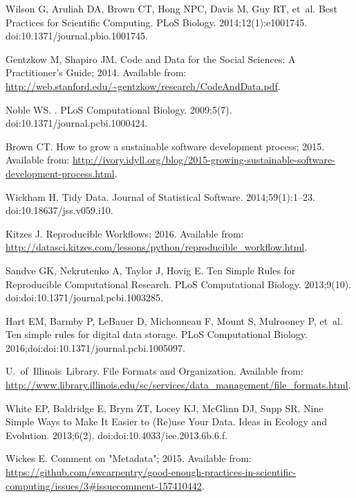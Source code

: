 \documentclass[10pt,letterpaper]{article}
\begin{document}
\begin{thebibliography}{10}

Wilson G, Aruliah DA, Brown CT, Hong NPC, Davis M, Guy RT, et~al.
\newblock Best Practices for Scientific Computing.
\newblock PLoS Biology. 2014;12(1):e1001745.
\newblock doi:{10.1371/journal.pbio.1001745}.

Gentzkow M, Shapiro JM. Code and Data for the Social Sciences: A Practitioner's
  Guide; 2014.
\newblock Available from:
  \url{http://web.stanford.edu/~gentzkow/research/CodeAndData.pdf}.

Noble WS.
.
\newblock PLoS Computational Biology. 2009;5(7).
\newblock doi:{10.1371/journal.pcbi.1000424}.

Brown CT. How to grow a sustainable software development process; 2015.
\newblock Available from:
  \url{http://ivory.idyll.org/blog/2015-growing-sustainable-software-development-process.html}.

Wickham H.
\newblock Tidy Data.
\newblock Journal of Statistical Software. 2014;59(1):1--23.
\newblock doi:{10.18637/jss.v059.i10}.

Kitzes J. Reproducible Workflows; 2016.
\newblock Available from:
  \url{http://datasci.kitzes.com/lessons/python/reproducible\_workflow.html}.

Sandve GK, Nekrutenko A, Taylor J, Hovig E.
\newblock Ten Simple Rules for Reproducible Computational Research.
\newblock PLoS Computational Biology. 2013;9(10).
\newblock doi:{doi:10.1371/journal.pcbi.1003285}.

Hart EM, Barmby P, LeBauer D, Michonneau F, Mount S, Mulrooney P, et~al.
\newblock Ten simple rules for digital data storage.
\newblock PLoS Computational Biology.
  2016;doi:{doi:10.1371/journal.pcbi.1005097}.

U.~of~Illinois~Library. File Formats and Organization.
\newblock Available from:
  \url{http://www.library.illinois.edu/sc/services/data\_management/file\_formats.html}.

White EP, Baldridge E, Brym ZT, Locey KJ, McGlinn DJ, Supp SR.
\newblock Nine Simple Ways to Make It Easier to (Re)use Your Data.
\newblock Ideas in Ecology and Evolution. 2013;6(2).
\newblock doi:{doi:10.4033/iee.2013.6b.6.f}.

Wickes E. Comment on "Metadata"; 2015.
\newblock Available from:
  \url{https://github.com/swcarpentry/good-enough-practices-in-scientific-computing/issues/3\#issuecomment-157410442}.


\end{thebibliography}
\end{document}
